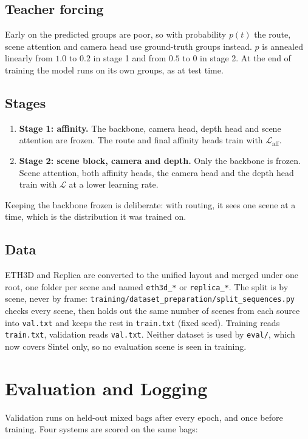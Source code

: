 \documentclass[11pt, a4paper]{article}
\newcommand{\Lall}{\mathcal{L}}
\begin{document}
\subsection{Teacher forcing}
\label{sec:teacher}
Early on the predicted groups are poor, so with probability $p(t)$ the route, scene attention and
camera head use ground-truth groups instead. $p$ is annealed linearly from $1.0$ to $0.2$ in
stage 1 and from $0.5$ to $0$ in stage 2. At the end of training the model runs on its own groups,
as at test time.

\subsection{Stages}
\begin{enumerate}
  \item \textbf{Stage 1: affinity.} The backbone, camera head, depth head and scene attention are
        frozen. The route and final affinity heads train with $\Lall_{\text{aff}}$.
  \item \textbf{Stage 2: scene block, camera and depth.} Only the backbone is frozen. Scene attention,
        both affinity heads, the camera head and the depth head train with $\Lall$ at a lower learning rate.
\end{enumerate}
Keeping the backbone frozen is deliberate: with routing, it sees one scene at a time, which is the
distribution it was trained on.

\subsection{Data}
ETH3D and Replica are converted to the unified layout and merged under one root, one folder per scene
and named \texttt{eth3d\_*} or \texttt{replica\_*}. The split is by scene, never by frame:
\texttt{training/dataset\_preparation/split\_sequences.py} checks every scene, then holds out the same
number of scenes from each source into \texttt{val.txt} and keeps the rest in \texttt{train.txt}
(fixed seed). Training reads \texttt{train.txt}, validation reads \texttt{val.txt}. Neither dataset is used
by \texttt{eval/}, which now covers Sintel only, so no evaluation scene is seen in training.

\section{Evaluation and Logging}
Validation runs on held-out mixed bags after every epoch, and once before training. Four systems
are scored on the same bags:
\end{document}
